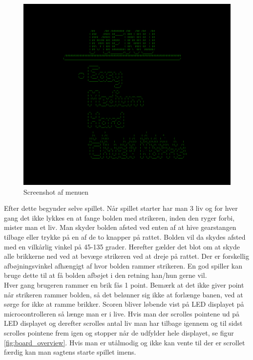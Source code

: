 \begin{figure}[h!]
\centering
\includegraphics[scale=0.25]{figs/screenshots/menu_crop.png}
\caption{Screenshot af menuen}
\label{fig:menu_2}
\end{figure}

Efter dette begynder selve spillet. Når spillet starter har man 3 liv og for hver gang det ikke lykkes en at fange bolden med strikeren, inden den ryger forbi, mister man et liv. Man skyder bolden afsted ved enten af at hive gearstangen tilbage eller trykke på en af de to knapper på rattet. Bolden vil da skydes afsted med en vilkårlig vinkel på 45-135 grader. Herefter gælder det blot om at skyde alle brikkerne ned ved at bevæge strikeren ved at dreje på rattet. Der er forskellig afbøjningsvinkel afhængigt af hvor bolden rammer strikeren. En god spiller kan bruge dette til at få bolden afbøjet i den retning han/hun gerne vil.\\

Hver gang brugeren rammer en brik fås 1 point. Bemærk at det ikke giver point når strikeren rammer bolden, så det belønner sig ikke at forlænge banen, ved at sørge for ikke at ramme brikker. Scoren bliver løbende vist på LED displayet på microcontrolleren så længe man er i live. Hvis man dør scrolles pointene ud på LED displayet og derefter scrolles antal liv man har tilbage igennem og til sidst scrolles pointene frem igen og stopper når de udfylder hele displayet, se figur \ref{fig:board_overview}. Hvis man er utålmodig og ikke kan vente til der er scrollet færdig kan man sagtens starte spillet imens.\\

